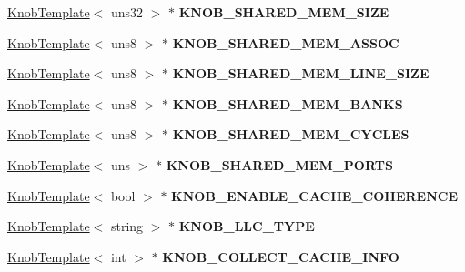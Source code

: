 \begin{DoxyCompactItemize}
\item 
\hypertarget{classall__knobs__c_ac91b8deb6f306020ffe6559aa5e37502}{
\hyperlink{classKnobTemplate}{KnobTemplate}$<$ uns32 $>$ $\ast$ {\bfseries KNOB\_\-SHARED\_\-MEM\_\-SIZE}}
\label{classall__knobs__c_ac91b8deb6f306020ffe6559aa5e37502}

\item 
\hypertarget{classall__knobs__c_a210dac12166bdf9a915fc6408486f0e7}{
\hyperlink{classKnobTemplate}{KnobTemplate}$<$ uns8 $>$ $\ast$ {\bfseries KNOB\_\-SHARED\_\-MEM\_\-ASSOC}}
\label{classall__knobs__c_a210dac12166bdf9a915fc6408486f0e7}

\item 
\hypertarget{classall__knobs__c_a7de4999938ede8fe9623233185147fd9}{
\hyperlink{classKnobTemplate}{KnobTemplate}$<$ uns8 $>$ $\ast$ {\bfseries KNOB\_\-SHARED\_\-MEM\_\-LINE\_\-SIZE}}
\label{classall__knobs__c_a7de4999938ede8fe9623233185147fd9}

\item 
\hypertarget{classall__knobs__c_a9aa07c1742f3e91b14ce729ee51cc134}{
\hyperlink{classKnobTemplate}{KnobTemplate}$<$ uns8 $>$ $\ast$ {\bfseries KNOB\_\-SHARED\_\-MEM\_\-BANKS}}
\label{classall__knobs__c_a9aa07c1742f3e91b14ce729ee51cc134}

\item 
\hypertarget{classall__knobs__c_a3acb0f29fba30089ccb5df0ea4fec80a}{
\hyperlink{classKnobTemplate}{KnobTemplate}$<$ uns8 $>$ $\ast$ {\bfseries KNOB\_\-SHARED\_\-MEM\_\-CYCLES}}
\label{classall__knobs__c_a3acb0f29fba30089ccb5df0ea4fec80a}

\item 
\hypertarget{classall__knobs__c_a28de160acc97ffff3a567bbe8e942f78}{
\hyperlink{classKnobTemplate}{KnobTemplate}$<$ uns $>$ $\ast$ {\bfseries KNOB\_\-SHARED\_\-MEM\_\-PORTS}}
\label{classall__knobs__c_a28de160acc97ffff3a567bbe8e942f78}

\item 
\hypertarget{classall__knobs__c_a0b7cf2dbf1590a721c26f97c6ff68489}{
\hyperlink{classKnobTemplate}{KnobTemplate}$<$ bool $>$ $\ast$ {\bfseries KNOB\_\-ENABLE\_\-CACHE\_\-COHERENCE}}
\label{classall__knobs__c_a0b7cf2dbf1590a721c26f97c6ff68489}

\item 
\hypertarget{classall__knobs__c_aa59d0969bd192c89a292dc2f17e57867}{
\hyperlink{classKnobTemplate}{KnobTemplate}$<$ string $>$ $\ast$ {\bfseries KNOB\_\-LLC\_\-TYPE}}
\label{classall__knobs__c_aa59d0969bd192c89a292dc2f17e57867}

\item 
\hypertarget{classall__knobs__c_ab65398259c63c42f4824a5f89c0caf73}{
\hyperlink{classKnobTemplate}{KnobTemplate}$<$ int $>$ $\ast$ {\bfseries KNOB\_\-COLLECT\_\-CACHE\_\-INFO}}
\label{classall__knobs__c_ab65398259c63c42f4824a5f89c0caf73}


\end{DoxyCompactItemize}
